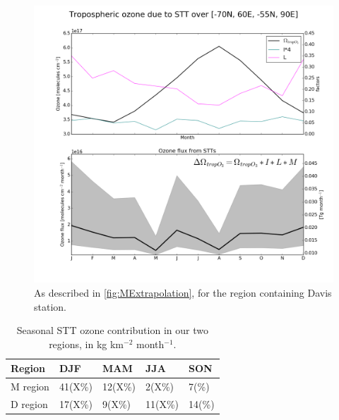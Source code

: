 \documentclass[acp, manuscript]{copernicus} %
\begin{document}
    \begin{figure}
      \includegraphics[width=12.0cm]{figures/STT_extrapolation_Dav_B.png}
      \caption{%
	As described in \ref{fig:MExtrapolation}, for the region containing Davis station.}
      \label{fig:DExtrapolation}
    \end{figure}
    
    \begin{table}[t]
      \captionsetup{justification=centering}
      \caption{Seasonal STT ozone contribution in our two regions, in kg km$^{-2}$ month$^{-1}$.}
      \begin{tabular}{ l l l l l } 
	\hline
	Region & DJF & MAM & JJA & SON \\
	\hline
	M region & 41(X\%) & 12(X\%) &  2(X\%) &  7(\%) \\ 
	D region & 17(X\%) &  9(X\%) & 11(X\%) & 14(\%) \\
	\hline
      \end{tabular}
      \label{table:extrapolationResults}
    \end{table}
    
\end{document}
